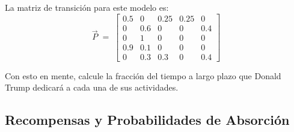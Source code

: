 \documentclass[ 10pt, xcolor = dvipsnames]{beamer}
\begin{document}
\begin{frame}[allowframebreaks]
La matriz de transici\'on para este modelo es: 
\[
\vec{P} \; = \; 
\left[
\begin{array}{ccccc}
0.5 & 0 & 0.25 & 0.25 & 0 \\
0 & 0.6 & 0 & 0 & 0.4 \\
0 & 1 & 0 & 0 & 0 \\
0.9 & 0.1 & 0 & 0 & 0 \\
0 & 0.3 & 0.3 & 0 & 0.4
\end{array}
\right]
\]
\halfskip

Con esto en mente, calcule la fracci\'on del tiempo a largo plazo que Donald Trump dedicar\'a a cada una de sus actividades. 

\end{frame}

\subsection{Recompensas y Probabilidades de Absorci\'on}
\end{document}
